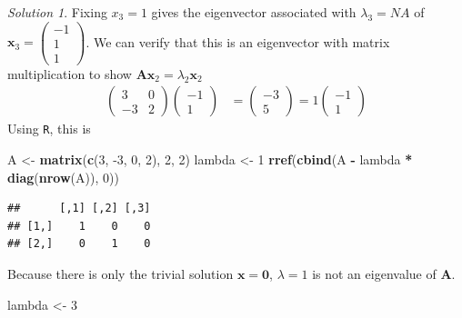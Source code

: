 \documentclass[
]{book}
\newenvironment{Shaded}{\begin{snugshade}}{\end{snugshade}}
\newcommand{\DecValTok}[1]{\textcolor[rgb]{0.00,0.00,0.81}{#1}}
\newcommand{\KeywordTok}[1]{\textcolor[rgb]{0.13,0.29,0.53}{\textbf{#1}}}
\newcommand{\NormalTok}[1]{#1}
\newcommand{\OperatorTok}[1]{\textcolor[rgb]{0.81,0.36,0.00}{\textbf{#1}}}
\newcommand{\StringTok}[1]{\textcolor[rgb]{0.31,0.60,0.02}{#1}}
\theoremstyle{definition}
\theoremstyle{definition}
\theoremstyle{definition}
\theoremstyle{definition}
\theoremstyle{remark}
\newtheorem*{solution}{Solution}
\begin{document}
\begin{solution}
Fixing \(x_3 = 1\) gives the eigenvector associated with \(\lambda_3 = NA\) of \(\mathbf{x}_3 = \begin{pmatrix} -1 \\ 1 \\ 1 \end{pmatrix}\). We can verify that this is an eigenvector with matrix multiplication to show \(\mathbf{A} \mathbf{x}_2 = \lambda_2 \mathbf{x}_2\)
\[
\begin{aligned}
\begin{pmatrix} 3 & 0 \\ -3 & 2 \end{pmatrix} \begin{pmatrix} -1 \\ 1 \end{pmatrix} & = \begin{pmatrix} -3 \\ 5 \end{pmatrix}  = 1 \begin{pmatrix} -1 \\ 1 \end{pmatrix}
\end{aligned}
\]
Using \texttt{R}, this is

\begin{Shaded}
\begin{Highlighting}[]
\NormalTok{A <-}\StringTok{  }\KeywordTok{matrix}\NormalTok{(}\KeywordTok{c}\NormalTok{(}\DecValTok{3}\NormalTok{, }\DecValTok{-3}\NormalTok{, }\DecValTok{0}\NormalTok{, }\DecValTok{2}\NormalTok{), }\DecValTok{2}\NormalTok{, }\DecValTok{2}\NormalTok{)}
\NormalTok{lambda <-}\StringTok{ }\DecValTok{1}
\KeywordTok{rref}\NormalTok{(}\KeywordTok{cbind}\NormalTok{(A }\OperatorTok{-}\StringTok{ }\NormalTok{lambda }\OperatorTok{*}\StringTok{ }\KeywordTok{diag}\NormalTok{(}\KeywordTok{nrow}\NormalTok{(A)), }\DecValTok{0}\NormalTok{))}
\end{Highlighting}
\end{Shaded}

\begin{verbatim}
##      [,1] [,2] [,3]
## [1,]    1    0    0
## [2,]    0    1    0
\end{verbatim}

Because there is only the trivial solution \(\mathbf{x} = \mathbf{0}\), \(\lambda = 1\) is not an eigenvalue of \(\mathbf{A}\).

\begin{Shaded}
\begin{Highlighting}[]
\NormalTok{lambda <-}\StringTok{ }\DecValTok{3}
\end{Highlighting}
\end{Shaded}


\end{solution}
\end{document}
